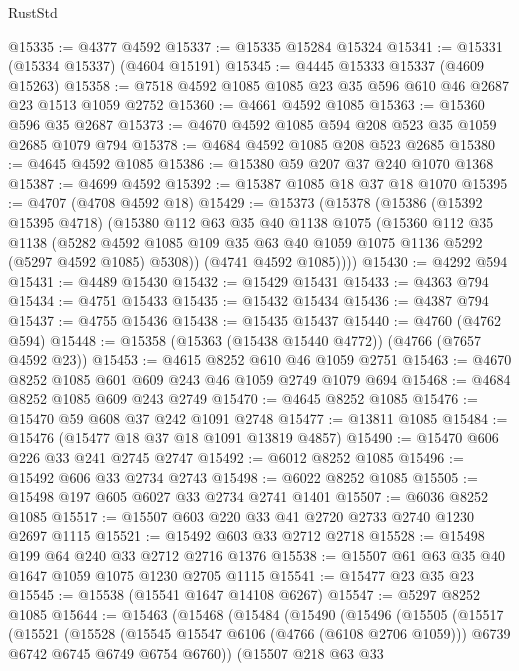 \begin{lexlean}{RustStd}
\begin{coremodule}
{\begin{coremodule}
{{{{{{{{{{{{{{{{{{{{{{{{{{{{{{{{{{{@15335 := @4377 @4592
@15337 := @15335 @15284 @15324
@15341 := @15331 (@15334 @15337) (@4604 @15191)
@15345 := @4445 @15333 @15337 (@4609 @15263)
@15358 := @7518 @4592 @1085 @1085 @23 @35 @596 @610 @46 @2687 @23 @1513 @1059 @2752
@15360 := @4661 @4592 @1085
@15363 := @15360 @596 @35 @2687
@15373 := @4670 @4592 @1085 @594 @208 @523 @35 @1059 @2685 @1079 @794
@15378 := @4684 @4592 @1085 @208 @523 @2685
@15380 := @4645 @4592 @1085
@15386 := @15380 @59 @207 @37 @240 @1070 @1368
@15387 := @4699 @4592
@15392 := @15387 @1085 @18 @37 @18 @1070
@15395 := @4707 (@4708 @4592 @18)
@15429 := @15373
    (@15378
      (@15386
        (@15392 @15395 @4718)
        (@15380
          @112
          @63
          @35
          @40
          @1138
          @1075
          (@15360
            @112
            @35
            @1138
            (@5282 @4592 @1085 @109 @35 @63 @40 @1059 @1075 @1136 @5292 (@5297 @4592 @1085) @5308))
          (@4741 @4592 @1085))))
@15430 := @4292 @594
@15431 := @4489 @15430
@15432 := @15429 @15431
@15433 := @4363 @794
@15434 := @4751 @15433
@15435 := @15432 @15434
@15436 := @4387 @794
@15437 := @4755 @15436
@15438 := @15435 @15437
@15440 := @4760 (@4762 @594)
@15448 := @15358 (@15363 (@15438 @15440 @4772)) (@4766 (@7657 @4592 @23))
@15453 := @4615 @8252 @610 @46 @1059 @2751
@15463 := @4670 @8252 @1085 @601 @609 @243 @46 @1059 @2749 @1079 @694
@15468 := @4684 @8252 @1085 @609 @243 @2749
@15470 := @4645 @8252 @1085
@15476 := @15470 @59 @608 @37 @242 @1091 @2748
@15477 := @13811 @1085
@15484 := @15476 (@15477 @18 @37 @18 @1091 @13819 @4857)
@15490 := @15470 @606 @226 @33 @241 @2745 @2747
@15492 := @6012 @8252 @1085
@15496 := @15492 @606 @33 @2734 @2743
@15498 := @6022 @8252 @1085
@15505 := @15498 @197 @605 @6027 @33 @2734 @2741 @1401
@15507 := @6036 @8252 @1085
@15517 := @15507 @603 @220 @33 @41 @2720 @2733 @2740 @1230 @2697 @1115
@15521 := @15492 @603 @33 @2712 @2718
@15528 := @15498 @199 @64 @240 @33 @2712 @2716 @1376
@15538 := @15507 @61 @63 @35 @40 @1647 @1059 @1075 @1230 @2705 @1115
@15541 := @15477 @23 @35 @23
@15545 := @15538 (@15541 @1647 @14108 @6267)
@15547 := @5297 @8252 @1085
@15644 := @15463
    (@15468
      (@15484
        (@15490
          (@15496
            (@15505
              (@15517
                (@15521
                  (@15528
                    (@15545 @15547 @6106 (@4766 (@6108 @2706 @1059)))
                    @6739
                    @6742
                    @6745
                    @6749
                    @6754
                    @6760))
                (@15507
                  @218
                  @63
                  @33
}}}}}}}}}}}}}}}}}}}}}}}}}}}}}}}}}}}
\end{coremodule}}
\end{coremodule}
\end{lexlean}
